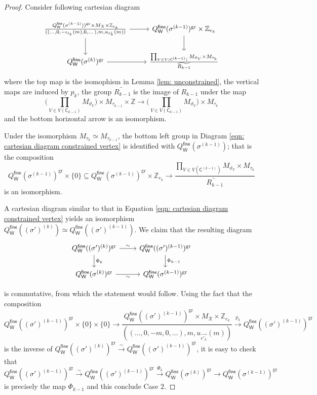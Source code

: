 \documentclass{article}
\def\Z{\mathbb{Z}}
\newcommand{\tropC}{\mathsf{C}}
\newcommand{\gr}{\mathrm{gr}}
\newcommand{\fine}{\mathsf{fine}}
\newcommand{\W}{\mathsf{W}}
\begin{document}
\begin{proof}
    Consider following cartesian diagram 

    \begin{equation}\label{eqn: cartesian diagram constrained vertex}
\begin{tikzcd}
\frac{Q^\fine_\W(\sigma^{(k-1)}))^{\gr} \times M_X \times \Z_{e_{k}}}{{((\ldots, 0,-\iota_{i_k}(m),0,\dots ), m, u_{\vec{e_k}}(m))}}  \arrow[r] \arrow[d] & Q^\fine_\W(\sigma^{(k-1)})^{\gr} \times \Z_{e_k} \arrow[d] \\
Q_\W^\fine(\sigma^{(k)})^{\gr} \arrow[r] & \frac{\prod_{V \in V(\tropC^{(k-1)})} M_{\vartheta_V} \times M_{\tau_{k}}}{\widetilde{R_{k-1}}}
\end{tikzcd}
\end{equation}
where the top map is the isomophism in Lemma \ref{lem: unconstrained}, the vertical maps are induced by $p_k$, the group $\widetilde{R_{k-1}}$ is the image of $R_{k-1}$ under the map 
$$
\bigg( \prod_{V \in V(\tropC_{k-1})} M_{\vartheta_V} \bigg) \times M_{\tau_{k-1}} \times \Z \to \bigg( \prod_{V \in V(\tropC_{k-1})} M_{\vartheta_V} \bigg) \times M_{\tau_{k}}
$$
and the bottom horizontal arrow is an isomorphism. 


Under the isomorphism $M_{\tau_k} \simeq M_{\tau_{k-1}}$, the bottom left group in Diagram \eqref{eqn: cartesian diagram constrained vertex} is identified with $Q_\W^\fine(\sigma^{(k-1)})$; that is the composition
$$
Q_\W^\fine(\sigma^{(k-1)})^{\gr} \times \{ 0\} \subseteq Q_\W^\fine(\sigma^{(k-1)})^{\gr} \times \Z_{e_k} \to \frac{\prod_{V \in V(\tropC^{(k-1)})} M_{\vartheta_V} \times M_{\tau_{k}}}{\widetilde{R_{k-1}}}
$$
is an isomorphism.

A cartesian diagram similar to that in Equation \eqref{eqn: cartesian diagram constrained vertex} yields an isomorphism $Q_\W^\fine((\sigma')^{(k)}) \simeq Q_\W^\fine((\sigma')^{(k-1)})$. We claim that the resulting diagram
\begin{equation*}
\begin{tikzcd}
Q_\W^\fine((\sigma')^{(k)})^{\gr} \arrow[r, "\sim"] \arrow[d, "\Phi_k"] & Q_\W^\fine((\sigma')^{(k-1)})^{\gr} \arrow[d, "\Phi_{k-1}"] \\
Q_\W^\fine(\sigma^{(k)})^{\gr} \arrow[r, "\sim"'] & Q_\W^\fine(\sigma^{(k-1)})^{\gr}
\end{tikzcd}
\end{equation*}

is commutative, from which the statement would follow. Using the fact that the composition
$$
Q_\W^\fine((\sigma')^{(k-1)})^{\gr} \times \{ 0 \} \times \{0 \} \longrightarrow \frac{Q^\fine_\W((\sigma')^{(k-1)})^{\gr} \times M_X \times \Z_{e_{k}}}{ ((\ldots, 0,-m,0,\dots ), m, u_{\vec{e'_k}}(m)) } \xrightarrow{p_k} Q_\W^\fine((\sigma')^{(k-1)})^{\gr}
$$
is the inverse of $Q_\W^\fine((\sigma')^{(k)})^{\gr} \xrightarrow{\sim} Q_\W^\fine((\sigma')^{(k-1)})^{\gr}$, it is easy to check that 
$$
Q_\W^\fine((\sigma')^{(k-1)})^{\gr} \xrightarrow{\sim} Q_\W^\fine((\sigma')^{(k-1)})^{\gr} \xrightarrow{\Phi_k} Q_\W^\fine(\sigma^{(k)})^{\gr}  \to Q_\W^\fine(\sigma^{(k-1)})^{\gr} 
$$
is precisely the map $\Phi_{k-1}$ and this conclude Case $2$.
    

\end{proof}
\end{document}
